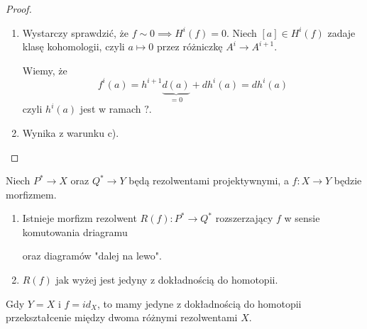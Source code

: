 \begin{proof}
\begin{enumerate}[label=(\alph*)]
    \item Wystarczy sprawdzić, że $f\sim 0\implies H^i(f)=0$. Niech $[a]\in H^i(f)$ zadaje klasę kohomologii, czyli $a\mapsto 0$ przez różniczkę $A^i\to A^{i+1}$.
      \begin{center}
      \end{center}
      Wiemy, że 
      $$f^i(a)=h^{i+1}\underbrace{d(a)}_{=0}+dh^i(a)=dh^i(a)$$
      czyli $h^i(a)$ jest w ramach $?$.
    \item Wynika z warunku c).
  \end{enumerate}
\end{proof}

\begin{fact}
  Niech $P^*\to X$ oraz $Q^*\to Y$ będą rezolwentami projektywnymi, a $f:X\to Y$ będzie morfizmem.
  \begin{enumerate}
    \item Istnieje morfizm rezolwent $R(f):P^*\to Q^*$ rozszerzający $f$ w sensie komutowania driagramu
      \begin{center}\end{center}
      oraz diagramów "dalej na lewo".
    \item $R(f)$ jak wyżej jest jedyny z dokładnością do homotopii.
  \end{enumerate}
\end{fact}

\begin{conclusion}
  Gdy $Y=X$ i $f=id_X$, to mamy jedyne z dokładnością do homotopii przekształcenie między dwoma różnymi rezolwentami $X$.

  \begin{center}\end{center}
\end{conclusion}


